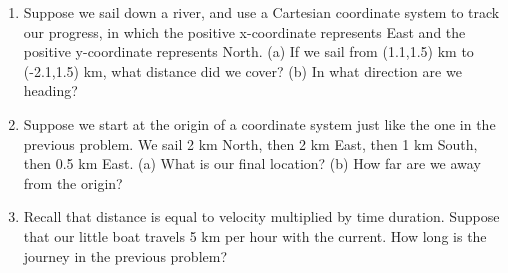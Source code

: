 \documentclass[10pt]{article}
\begin{document}
\begin{enumerate}
\item Suppose we sail down a river, and use a Cartesian coordinate system to track our progress, in which the positive x-coordinate represents East and the positive y-coordinate represents North.  (a) If we sail from (1.1,1.5) km to (-2.1,1.5) km, what distance did we cover?  (b) In what direction are we heading? \\ \vspace{3cm}
\item Suppose we start at the origin of a coordinate system just like the one in the previous problem. We sail 2 km North, then 2 km East, then 1 km South, then 0.5 km East.  (a) What is our final location?  (b) How far are we away from the origin? \\ \vspace{3cm}
\item Recall that distance is equal to velocity multiplied by time duration.  Suppose that our little boat travels 5 km per hour with the current.  How long is the journey in the previous problem?
\end{enumerate}
\end{document}
